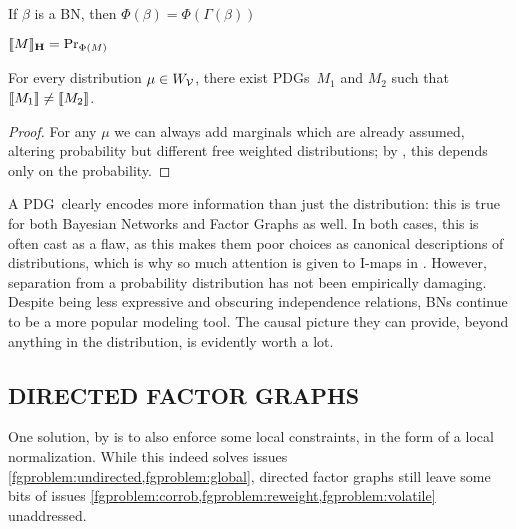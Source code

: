 \documentclass{article}
\newcommand\MaxEnt{_{\mathbf H}}
\newcommand{\bmu}{\boldsymbol{\mu}}
\newcommand{\Ed}{\mathcal E}
\newcommand{\MN}{PDG}
\newcommand{\MNs}{\MN s}
\numberwithin{equation}{section}
\begin{document}

	\begin{prop}
		If $\beta$ is a BN, then $\Phi(\beta)  = \Phi(\Gamma(\beta))$
	\end{prop}


	\begin{conj}\label{thm:noninj}
		$\bbr{M}\MaxEnt = \Pr_{\Phi(M)}$
	\end{conj}
	\begin{coro}\label{coro:same-dist;different-weight}
		For every distribution $\mu \in W_{\cal V}$, there exist \MNs\ $M_1$ and $M_2$ such that $\llbracket M_1\rrbracket \neq \llbracket M_2\rrbracket$. 
	\end{coro}
	\begin{proof}
		For any $\mu$ we can always add marginals which are already assumed, altering probability but different free weighted distributions; by , this depends only on the probability.
	\end{proof}
	
	A \MN\ clearly encodes more information than just the distribution: this is true for both Bayesian Networks and Factor Graphs as well. In both cases, this is often cast as a flaw, as this makes them poor choices as canonical descriptions of distributions, which is why so much attention is given to I-maps in \parencite{koller2009probabilistic}. However, separation from a probability distribution has not been empirically damaging. Despite being less expressive and obscuring independence relations, BNs continue to be a more popular modeling tool. The causal picture they can provide, beyond anything in the distribution, is evidently worth a lot.


	\subsection{DIRECTED FACTOR GRAPHS}
	
	One solution, by \parencite{frey2012extending} is to also enforce some local constraints, in the form of a local normalization.  While this indeed solves issues \cref{fgproblem:undirected,fgproblem:global}, directed factor graphs still leave some bits of issues \cref{fgproblem:corrob,fgproblem:reweight,fgproblem:volatile} unaddressed.
	
\end{document}
